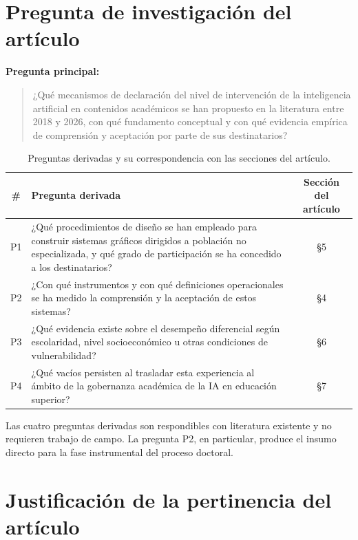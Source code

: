 \documentclass[letter,12pt]{article}
\begin{document}
\section{Pregunta de investigación del artículo}\label{sec:pregunta-articulo}

\noindent\textbf{Pregunta principal:}

\begin{quote}
¿Qué mecanismos de declaración del nivel de intervención de la inteligencia artificial en contenidos académicos se han propuesto en la literatura entre 2018 y 2026, con qué fundamento conceptual y con qué evidencia empírica de comprensión y aceptación por parte de sus destinatarios?
\end{quote}

\begin{table}[H]
\centering
\footnotesize
\caption{Preguntas derivadas y su correspondencia con las secciones del artículo.}
\label{tab:preguntas}
\renewcommand{\arraystretch}{1.35}
\begin{tabular}{|c|p{8.6cm}|c|}
\hline
\rowcolor{bgCotejo}
\textbf{\#} & \textbf{Pregunta derivada} & \textbf{Sección del artículo} \\
\hline
P1 & ¿Qué procedimientos de diseño se han empleado para construir sistemas gráficos dirigidos a población no especializada, y qué grado de participación se ha concedido a los destinatarios? & \S5 \\
\hline
P2 & ¿Con qué instrumentos y con qué definiciones operacionales se ha medido la comprensión y la aceptación de estos sistemas? & \S4 \\
\hline
P3 & ¿Qué evidencia existe sobre el desempeño diferencial según escolaridad, nivel socioeconómico u otras condiciones de vulnerabilidad? & \S6 \\
\hline
P4 & ¿Qué vacíos persisten al trasladar esta experiencia al ámbito de la gobernanza académica de la IA en educación superior? & \S7 \\
\hline
\end{tabular}
\end{table}

Las cuatro preguntas derivadas son respondibles con literatura existente y no requieren trabajo de campo. La pregunta P2, en particular, produce el insumo directo para la fase instrumental del proceso doctoral.

\section{Justificación de la pertinencia del artículo}\label{sec:pertinencia}
\end{document}
